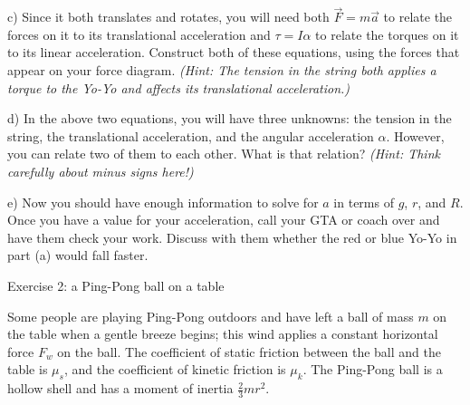 \documentclass[12pt]{article}
\begin{document}
\vspace{2in}

\newpage

c) Since it both translates and rotates, you will need both $\vec F = m \vec a$ to relate the forces on it to its translational acceleration and $\tau = I \alpha$ to relate the torques on it to its linear acceleration. Construct both of these equations, using the forces that appear on your force diagram. \textit{(Hint: The tension in the string both applies a torque to the Yo-Yo and affects its translational acceleration.)}

\vspace{2.5in}

d) In the above two equations, you will have three unknowns: the tension in the string, the translational acceleration, and the angular acceleration $\alpha$. However, you can relate two of them to each other. What is that relation? \textit{(Hint: Think carefully about minus signs here!)}

\vspace{1in}

e) Now you should have enough information to solve for $a$ in terms of $g$, $r$, and $R$. Once you have a value for your acceleration, call your GTA or coach over and have them check your work. Discuss with them whether the red or blue Yo-Yo in part (a) would fall faster. 

\newpage

\begin{center}
	\large Exercise 2: a Ping-Pong ball on a table
\end{center}

Some people are playing Ping-Pong outdoors and have left a ball of mass $m$ on the table when a gentle breeze begins; this wind applies a constant horizontal force $F_w$ on the ball. The coefficient of static friction between the ball and the table is $\mu_s$, and the coefficient of kinetic friction is $\mu_k$. The Ping-Pong ball is a hollow shell and has a moment of inertia $\frac{2}{3}mr^2$.
\end{document}
